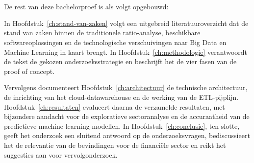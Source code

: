 \section{}%
\label{sec:opzet-bachelorproef}

De rest van deze bachelorproef is als volgt opgebouwd:

In Hoofdstuk~\ref{ch:stand-van-zaken} volgt een uitgebreid literatuuroverzicht dat de stand van zaken binnen de traditionele ratio-analyse, beschikbare softwareoplossingen en de technologische verschuivingen naar Big Data en Machine Learning in kaart brengt. In Hoofdstuk~\ref{ch:methodologie} verantwoordt de tekst de gekozen onderzoeksstrategie en beschrijft het de vier fasen van de proof of concept.

Vervolgens documenteert Hoofdstuk~\ref{ch:architectuur} de technische architectuur, de inrichting van het cloud-datawarehouse en de werking van de ETL-pijplijn. Hoofdstuk~\ref{ch:resultaten} evalueert daarna de verzamelde resultaten, met bijzondere aandacht voor de exploratieve sectoranalyse en de accuraatheid van de predictieve machine learning-modellen. In Hoofdstuk~\ref{ch:conclusie}, ten slotte, geeft het onderzoek een sluitend antwoord op de onderzoeksvragen, bediscussieert het de relevantie van de bevindingen voor de financiële sector en reikt het suggesties aan voor vervolgonderzoek.